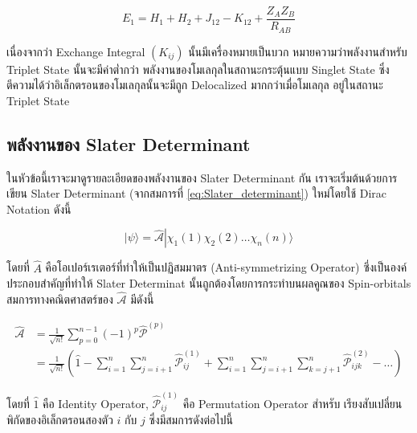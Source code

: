\begin{equation}
    E_1
    =
    H_1 + H_2 + J_{12} - K_{12} + \frac{Z_A Z_B}{R_{A B}}
\end{equation}

เนื่องจากว่า Exchange Integral $(K_{i j})$ นั้นมีเครื่องหมายเป็นบวก หมายความว่าพลังงานสำหรับ Triplet State นั้นจะมีค่าต่ำกว่า%
พลังงานของโมเลกุลในสถานะกระตุ้นแบบ Singlet State ซึ่งตีความได้ว่าอิเล็กตรอนของโมเลกุลนั้นจะมีถูก Delocalized มากกว่าเมื่อโมเลกุล%
อยู่ในสถานะ Triplet State

\subsection{พลังงานของ Slater Determinant}

ในหัวข้อนี้เราจะมาดูรายละเอียดของพลังงานของ Slater Determinant กัน เราจะเริ่มต้นด้วยการเขียน Slater Determinant (จากสมการที่
\eqref{eq:Slater_determinant}) ใหม่โดยใช้ Dirac Notation ดังนี้

\begin{equation}
    \label{eq:Slater_determinant_simple}
    |\psi\rangle
    =
    \hat{\mathscr{A}} \left|\right. \chi_1(1) \chi_2(2) \ldots \chi_n(n)\bigr\rangle
\end{equation}

\noindent โดยที่ $\hat{A}$ คือโอเปอร์เรเตอร์ที่ทำให้เป็นปฏิสมมาตร (Anti-symmetrizing Operator) ซึ่งเป็นองค์ประกอบสำคัญที่ทำให้%
Slater Determinat นั้นถูกต้องโดยการกระทำบนผลคูณของ Spin-orbitals สมการทางคณิตศาสตร์ของ $\hat{\mathscr{A}}$ มีดังนี้

\begin{equation}
    \label{eq:Antisymmetrizing_operator}
    \begin{aligned}
        \hat{\mathscr{A}}
         & = \frac{1}{\sqrt{n !}} \sum_{p=0}^{n-1}(-1)^p \hat{\mathscr{P}}^{(p)}                         \\
         & = \frac{1}{\sqrt{n !}}\left(\hat{1}-\sum_{i=1}^n \sum_{j=i+1}^n \hat{\mathscr{P}}_{i j}^{(1)}
        + \sum_{i=1}^n \sum_{j=i+1}^n \sum_{k=j+1}^n \hat{\mathscr{P}}_{i j k}^{(2)}-\ldots\right)
    \end{aligned}
\end{equation}

\noindent โดยที่ $\hat{1}$ คือ Identity Operator, $\hat{\mathscr{P}}_{i j}^{(1)}$ คือ Permutation Operator สำหรับ%
เรียงสับเปลี่ยนพิกัดของอิเล็กตรอนสองตัว $i$ กับ $j$ ซึ่งมีสมการดังต่อไปนี้

